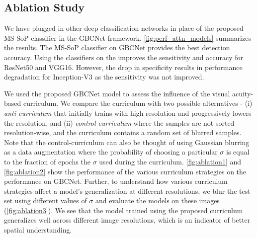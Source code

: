 \subsection{Ablation Study}
%
%
We have plugged in other deep classification networks in place of the proposed MS-SoP classifier in the GBCNet framework. \cref{fig:perf_attn_models} summarizes the results. The MS-SoP classifier on GBCNet provides the best \gbc detection accuracy. Using the classifiers on the \rois improves the sensitivity and accuracy for ResNet50 and VGG16. However, the drop in specificity results in performance degradation for Inception-V3 as the sensitivity was not improved.  

%
We used the proposed GBCNet model to assess the influence of the visual acuity-based curriculum. We compare the curriculum with two possible alternatives - (i) \emph{anti-curriculum} that initially trains with high resolution and progressively lowers the resolution, and (ii) \emph{control-curriculum} where the samples are not sorted resolution-wise, and the curriculum contains a random set of blurred samples. Note that the control-curriculum can also be thought of using Gaussian blurring as a data augmentation where the probability of choosing a particular $\sigma$ is equal to the fraction of epochs the $\sigma$ used during the curriculum. \cref{fig:ablation1} and \ref{fig:ablation2} show the performance of the various curriculum strategies on the performance on GBCNet.  %
Further, to understand how various curriculum strategies affect a model's generalization at different resolutions, we blur the test set using different values of $\sigma$ and evaluate the models on these images (\cref{fig:ablation3}). 
We see that the model trained using the proposed curriculum generalizes well across different image resolutions, which is an indicator of better spatial understanding.

